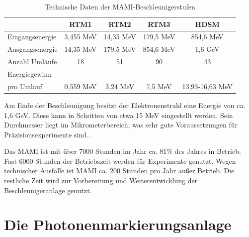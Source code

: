 \documentclass[a4paper,11pt,oneside,final,german,openbib,pdftex]{scrbook}
\begin{document}
{\begin{table}[h!]
		\begin{tabular}{|l|c|c|c|c|}
			\hline
			& RTM1 & RTM2 & RTM3 & HDSM \\
			\hline
			\hline
			Eingangsenergie &3,455 MeV  &  14,35 MeV& 179,5 MeV  &854,6 MeV \\ \hline
			Ausgangsenergie &14,35 MeV  &  179,5 MeV &854,6 MeV  & 1,6 GeV \\ \hline
			Anzahl Uml\"aufe&18  &51  &90  &43 \\ \hline
			Energiegewinn &&&& 
			\\pro Umlauf &0,559 MeV  & 3,24 MeV & 7,5 MeV  & 13,93-16,63 MeV \\ \hline
			
	
		\end{tabular}

		\caption[Technische Daten der Mamibeschleunigerstufen]{Technische Daten der MAMI-Beschleunigerstufen \cite{Un08}}
		\label{tab.MAMIstufen}

\end{table}

 Am Ende der Beschleunigung besitzt der Elektronenstrahl eine Energie von ca. 1,6 GeV. Diese kann in Schritten von etwa 15 MeV eingestellt werden. Sein Durchmesser liegt im Mikrometerbereich, was sehr gute Voraussetzungen f\"ur Pr\"azisionsexperimente sind.\cite{KPh07}. 
 
 Das MAMI ist mit \"uber 7000 Stunden im Jahr ca. 81\% des Jahres in Betrieb. Fast 6000 Stunden der Betriebszeit werden f\"ur Experimente genutzt. Wegen technischer Ausf\"alle ist MAMI ca. 200 Stunden pro Jahr au{\ss}er Betrieb. Die restliche Zeit wird zur Vorbereitung und Weiterentwicklung der Beschleunigeranlage genutzt.\cite{KPh11B}
 
 
 \section{Die Photonenmarkierungsanlage}
 
}
\end{document}
